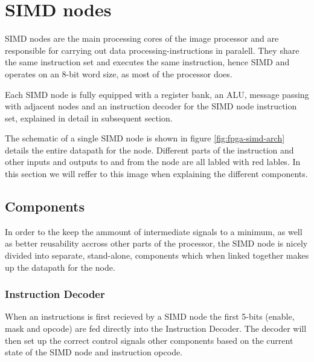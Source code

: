 \section{SIMD nodes}

\ac{SIMD} nodes are the main processing cores of the image processor and are
responsible for carrying out data processing-instructions in paralell. They
share the same instruction set and executes the same instruction, hence
\acf{SIMD} and operates on an 8-bit word size, as most of the processor does.

Each \ac{SIMD} node is fully equipped with a register bank, an \ac{ALU}, message
passing with adjacent nodes and an instruction decoder for the \ac{SIMD} node
instruction set, explained in detail in subsequent section.

The schematic of a single \ac{SIMD} node is shown in figure
\ref{fig:fpga-simd-arch} details the entire datapath for the node. Different
parts of the instruction and other inputs and outputs to and from the node are
all labled with red lables. In this section we will reffer to this image when
explaining the different components.




\subsection{Components}


In order to the keep the ammount of intermediate signals to a minimum, as well
as better reusability accross other parts of the processor, the \ac{SIMD} node
is nicely divided into separate, stand-alone, components which when linked
together makes up the datapath for the node.

\subsubsection{Instruction Decoder}


When an instructions is first recieved by a \ac{SIMD} node the first 5-bits
(enable, mask and opcode) are fed directly into the Instruction Decoder. The
decoder will then set up the correct control signals other components based on
the current state of the \ac{SIMD} node and instruction opcode.

